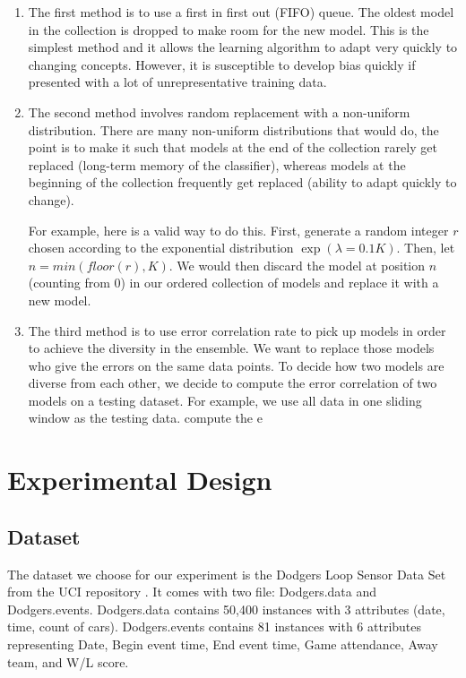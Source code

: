 \documentclass[conference]{IEEEtran}
\begin{document}
		\begin{enumerate}
			\item The first method is to use a first in first out (FIFO) queue. The oldest model in the collection is dropped to make room for the new model. This is the simplest method and it allows the learning algorithm to adapt very quickly to changing concepts. However, it is susceptible to develop bias quickly if presented with a lot of unrepresentative training data.
			\item The second method involves random replacement with a non-uniform distribution. There are many non-uniform distributions that would do, the point is to make it such that models at the end of the collection rarely get replaced (long-term memory of the classifier), whereas models at the beginning of the collection frequently get replaced (ability to adapt quickly to change).
			
			For example, here is a valid way to do this. First, generate a random integer $r$ chosen according to the exponential distribution $\exp(\lambda = 0.1 K)$. Then, let $n = min(floor(r), K)$. We would then discard the model at position $n$ (counting from 0) in our ordered collection of models and replace it with a new model.
			
			\item The third method is to use error correlation rate to pick up models in order to achieve the diversity in the ensemble. We want to replace those models who give the errors on the same data points. To decide how two models are diverse from each other, we decide to compute the error correlation of two models on a testing dataset. For example, we use all data in one sliding window as the testing data.  compute the e 
		\end{enumerate}
		
		
		
		
		\section{Experimental Design}
		\label{sec:experimental-design}
		\subsection{Dataset}
		The dataset we choose for our experiment is the Dodgers Loop Sensor Data Set from the UCI repository \cite{dataset}. It comes with two file: Dodgers.data and Dodgers.events. Dodgers.data contains 50,400 instances with 3 attributes (date, time, count of cars). Dodgers.events contains 81 instances with 6 attributes representing  Date, Begin event time, End event time, Game attendance, Away team, and W/L score. 
		
\end{document}
